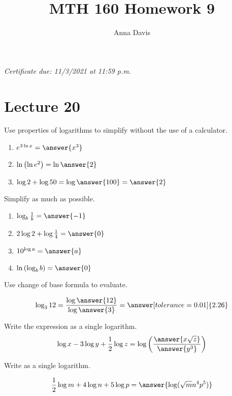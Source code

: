 \documentclass{ximera}
\author{Anna Davis} \title{MTH 160 Homework 9}
\begin{document}
\begin{abstract}

\end{abstract}
\maketitle
 \textit{Certificate due: 11/3/2021 at 11:59 p.m.}
 \section{Lecture 20}
 
  \begin{problem}\label{prob:160hom8prob1} 
Use properties of logarithms to simplify without the use of a calculator.
\begin{enumerate}
    \item $e^{3\ln x}=\answer{x^3}$
    \item $\ln\left(\ln e^2\right)=\ln\answer{2}$
    \item $\log 2 +\log 50=\log \answer{100}=\answer{2}$
\end{enumerate}
\end{problem}

\begin{problem}\label{prob:160hom8prob8}
 Simplify as much as possible.
 \begin{enumerate}
     \item $\log_b \frac{1}{b}=\answer{-1}$
     \item $2\log 2+\log\frac{1}{4}=\answer{0}$
     \item $10^{\log a}=\answer{a}$
     \item $\ln\left(\log_b b\right)=\answer{0}$
 \end{enumerate}
 \end{problem}

\begin{problem}\label{prob:160hom8prob2}
Use change of base formula to evaluate. 

$$\log_3 12=\frac{\log\answer{12}}{\log\answer{3}}=\answer[tolerance=0.01]{2.26}$$
\end{problem}

\begin{problem}\label{prob:160hom8prob3}
Write the expression as a single logarithm.
$$\log x-3\log y+\frac{1}{2}\log z=\log\left(\frac{\answer{x\sqrt{z}}}{\answer{y^3}}\right)$$
\end{problem}

\begin{problem}\label{prob:160hom8prob10}
 Write as a single logarithm.
 
 $$\frac{1}{2}\log m+4\log n+5\log p=\answer{\log(\sqrt{m}n^4p^5)}$$
 \end{problem}
 
\end{document}
